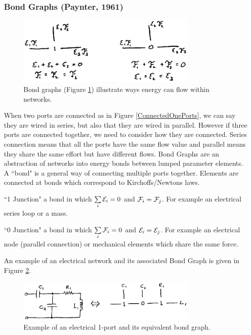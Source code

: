 \subsubsection{Bond Graphs (Paynter, 1961) }


\begin{figure}[h]	%
\centering \includegraphics[width=3.5in]{figs14/00309.eps}
\caption{Bond graphs (Figure \ref{BondGraphs}) illustrate ways energy can flow within networks.}\label{BondGraphs}	%
\end{figure}	%

 When two ports are connected as in Figure \ref{ConnectedOnePorts}, we can say they are wired in series, but also that they are wired in parallel.  However if three ports are connected together, we need to consider how they are connected.  Series connection means that all the ports have the same flow value and parallel means they share the same effort but have different flows.  Bond Graphs are an abstraction of networks into energy bonds between lumped parameter elements. A ``bond" is a general way of connecting multiple ports together.     Elements are connected at bonds which correspond to Kirchoffs/Newtons laws.	%

``1 Junction" a bond in which $\sum\limits_i \mathcal{E}_i = 0$ and $\mathcal{F}_i = \mathcal{F}_j$.  For example an electrical series loop or a mass.

``0 Junction" a bond in which $\sum\limits_i \mathcal{F}_i = 0$ and $\mathcal{E}_i = \mathcal{E}_j$.  For example an electrical node (parallel connection) or   mechanical elements which share the same force.



An example of an electrical network and its associated Bond Graph is given in Figure \ref{CircuitToBond}.	%

%
\begin{figure}[h]	%
\centering \includegraphics[width=3.5in]{figs14/00314.eps}
\caption{Example of an electrical 1-port and its equivalent bond graph.}\label{CircuitToBond}	%
\end{figure}	%


